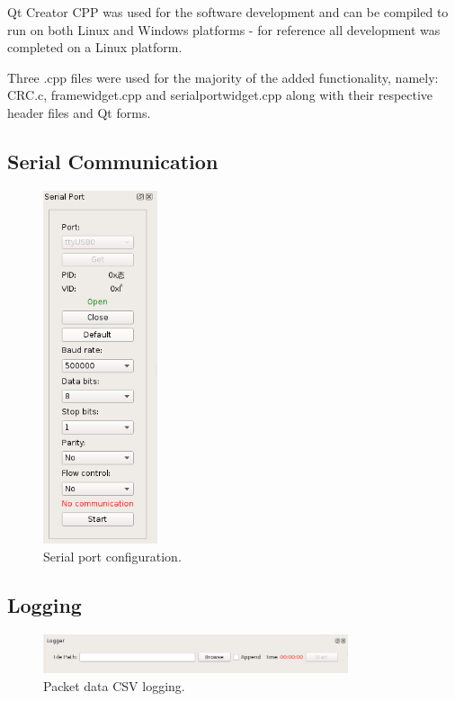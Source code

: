 Qt Creator CPP was used for the software development and can be compiled to run on both Linux and Windows platforms - for reference all development was completed on a Linux platform.

Three .cpp files were used for the majority of the added functionality, namely: CRC.c, framewidget.cpp and serialportwidget.cpp along with their respective header files and Qt forms.

\subsection{Serial Communication}

\begin{figure}
\centering
\includegraphics[width=0.3\textwidth]{images/gui/serial-port}
\caption{Serial port configuration.}
\label{fig:serial-config}
\end{figure}

\subsection{Logging}

\begin{figure}
\centering
\includegraphics[width=0.8\textwidth]{images/gui/logger}
\caption{Packet data CSV logging.}
\label{fig:packet-logging}
\end{figure}

